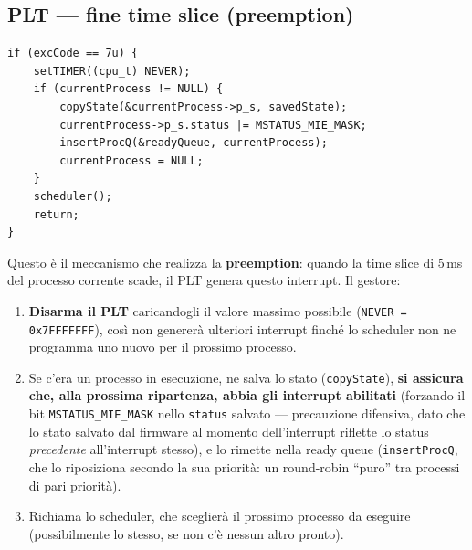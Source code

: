 \documentclass[11pt,a4paper]{article}
\newcommand{\code}[1]{\texttt{#1}}
\begin{document}
\subsection{PLT --- fine time slice (preemption)}
\begin{lstlisting}
if (excCode == 7u) {
    setTIMER((cpu_t) NEVER);
    if (currentProcess != NULL) {
        copyState(&currentProcess->p_s, savedState);
        currentProcess->p_s.status |= MSTATUS_MIE_MASK;
        insertProcQ(&readyQueue, currentProcess);
        currentProcess = NULL;
    }
    scheduler();
    return;
}
\end{lstlisting}
Questo è il meccanismo che realizza la \textbf{preemption}: quando la time
slice di 5\,ms del processo corrente scade, il PLT genera questo interrupt.
Il gestore:
\begin{enumerate}
\item \textbf{Disarma il PLT} caricandogli il valore massimo possibile
  (\code{NEVER = 0x7FFFFFFF}), così non genererà ulteriori interrupt finché
  lo scheduler non ne programma uno nuovo per il prossimo processo.
\item Se c'era un processo in esecuzione, ne salva lo stato
  (\code{copyState}), \textbf{si assicura che, alla prossima ripartenza,
  abbia gli interrupt abilitati} (forzando il bit \code{MSTATUS\_MIE\_MASK}
  nello \code{status} salvato --- precauzione difensiva, dato che lo stato
  salvato dal firmware al momento dell'interrupt riflette lo status
  \emph{precedente} all'interrupt stesso), e lo rimette nella ready queue
  (\code{insertProcQ}, che lo riposiziona secondo la sua priorità: un
  round-robin ``puro'' tra processi di pari priorità).
\item Richiama lo scheduler, che sceglierà il prossimo processo da
  eseguire (possibilmente lo stesso, se non c'è nessun altro pronto).
\end{enumerate}
\end{document}
